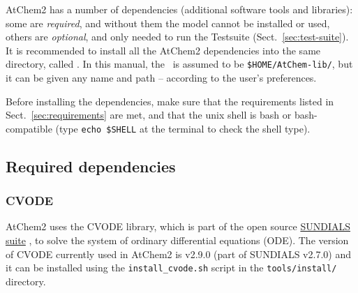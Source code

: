 AtChem2 has a number of dependencies (additional software tools and
libraries): some are \emph{required}, and without them the model
cannot be installed or used, others are \emph{optional}, and only
needed to run the Testsuite (Sect.~\ref{sec:test-suite}).  It is
recommended to install all the AtChem2 dependencies into the same
directory, called \depdir. In this manual, the \depdir\ is assumed to
be \texttt{\$HOME/AtChem-lib/}, but it can be given any name and path
-- according to the user's preferences.

Before installing the dependencies, make sure that the requirements
listed in Sect.~\ref{sec:requirements} are met, and that the unix
shell is bash or bash-compatible (type \verb|echo $SHELL| at the
terminal to check the shell type).

\subsection{Required dependencies} \label{subsec:required-dependencies}



\subsubsection{CVODE}

AtChem2 uses the CVODE library, which is part of the open source
\href{https://computing.llnl.gov/projects/sundials}{SUNDIALS suite}
\citep{hindmarsh_2005}, to solve the system of ordinary differential
equations (ODE). The version of CVODE currently used in AtChem2 is
v2.9.0 (part of SUNDIALS v2.7.0) and it can be installed using the
\texttt{install\_cvode.sh} script in the \texttt{tools/install/}
directory.

